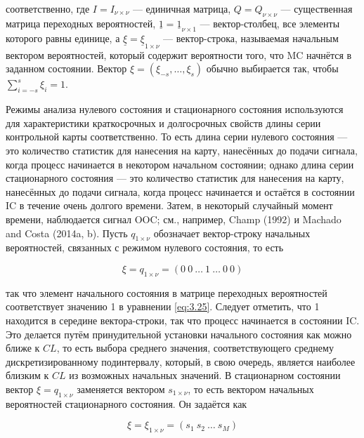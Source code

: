соответственно, где \(I = I_{\nu \times \nu}\) — единичная матрица, \(Q = Q_{\nu \times \nu}\) — существенная матрица переходных вероятностей, \(\underline{1} = \underline{1}_{\nu \times 1}\) — вектор-столбец, все элементы которого равны единице, а \(\underline{\xi} = \underline{\xi}_{1 \times \nu}\) — вектор-строка, называемая начальным вектором вероятностей, который содержит вероятности того, что MC начнётся в заданном состоянии. Вектор \(\xi = (\xi_{-s}, \ldots, \xi_{s})\) обычно выбирается так, чтобы \(\sum_{i=-s}^{s} \xi_{i} = 1\).

Режимы анализа нулевого состояния и стационарного состояния используются для характеристики краткосрочных и долгосрочных свойств длины серии контрольной карты соответственно. То есть длина серии нулевого состояния — это количество статистик для нанесения на карту, нанесённых до подачи сигнала, когда процесс начинается в некотором начальном состоянии; однако длина серии стационарного состояния — это количество статистик для нанесения на карту, нанесённых до подачи сигнала, когда процесс начинается и остаётся в состоянии IC в течение очень долгого времени. Затем, в некоторый случайный момент времени, наблюдается сигнал OOC; см., например, Champ (1992) и Machado and Costa (2014a, b). Пусть \(q_{1 \times \nu}\) обозначает вектор-строку начальных вероятностей, связанных с режимом нулевого состояния, то есть

\begin{equation}
	\xi = q_{1 \times \nu} = (0 \ 0 \ \ldots \ 1 \ \ldots \ 0 \ 0)
	\label{eq:3.25}
\end{equation}

так что элемент начального состояния в матрице переходных вероятностей соответствует значению 1 в уравнении \eqref{eq:3.25}. Следует отметить, что 1 находится в середине вектора-строки, так что процесс начинается в состоянии IC. Это делается путём принудительной установки начального состояния как можно ближе к \(CL\), то есть выбора среднего значения, соответствующего среднему дискретизированному подинтервалу, который, в свою очередь, является наиболее близким к \(CL\) из возможных начальных значений. В стационарном состоянии вектор \(\xi = q_{1 \times \nu}\) заменяется вектором \(s_{1 \times \nu}\), то есть вектором начальных вероятностей стационарного состояния. Он задаётся как

\begin{equation}
	\xi = \xi_{1 \times \nu} = (s_{1} \ s_{2} \ \ldots \ s_{M})
	\label{eq:3.26}
\end{equation}

